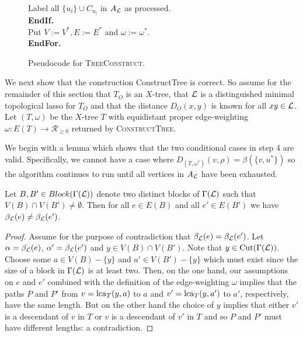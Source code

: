 \begin{figure}
{\begin{tabbing}
 \> \> \> Label all $\{u_i\} \cup C_{u_i}$ in $A_{{\mathcal L}}$ as processed.\\

 \> \> \textbf{EndIf.}\\

 \> \> Put $V:=V^*, E:=E^*$ and $\omega:=\omega^*$.\\

 \> \textbf{EndFor.}

         \end{tabbing}}
\caption{Pseudocode for \textsc{TreeConstruct}.}
\label{algorithm:treeconstruct2}
\end{figure}

We next show that the construction ConstructTree is correct.  So assume for
the remainder of this section that $T_O$ is an $X$-tree, that ${\mathcal L}$ is a
distinguished minimal topological lasso for $T_O$ and that the distance $D_O(x,y)$
is known for all $xy \in {\mathcal L}$.  Let $(T,\omega)$ be the $X$-tree $T$ with
equidistant proper edge-weighting $\omega \colon E(T) \to
\mathcal{R}_{\geq 0}$ returned by \textsc{ConstructTree}.

We begin with a lemma which shows that the two conditional cases in step 4 are
valid.  Specifically, we cannot have a case where
$D_{(T,\omega^*)}(v,\rho) = \beta(\{v,u^*\})$ so the algorithm continues to
run until all vertices in $A_{{\mathcal L}}$ have been exhausted.

\begin{lem}
  \label{lem:nonequal-adjacent}
  Let $B,B' \in Block(\Gamma({\mathcal L}))$ denote two distinct blocks of
  $\Gamma({\mathcal L})$ such that $V(B) \cap V(B') \neq \emptyset$.  Then for all $e
  \in E(B)$ and all $e' \in E(B')$ we have $\beta_{{\mathcal L}}(e) \neq \beta_{{\mathcal L}}(e')$.
\end{lem}

\begin{proof}
  Assume for the purpose of contradiction that $\beta_{{\mathcal L}}(e) = \beta_{{\mathcal L}}(e')$.  Let
  $\alpha = \beta_{{\mathcal L}}(e)$, $\alpha' = \beta_{{\mathcal L}}(e')$ and $y \in V(B) \cap V(B')$.  Note
  that $y \in \operatorname*{Cut}(\Gamma({\mathcal L}))$.  Choose some $a \in V(B) - \{y\}$ and $a'
  \in V(B') - \{y\}$ which must exist since the size of a block in
  $\Gamma({\mathcal L})$ is at least two.  Then, on the one hand, our assumptions on
  $e$ and $e'$ combined with the definition of the edge-weighting $\omega$
  implies that the paths $P$ and $P'$ from $v = \operatorname{lca}_{T}(y,a)$ to $a$ and $v'
  = \operatorname{lca}_{T}(y,a')$ to $a'$, respectively, have the same length.  But on the
  other hand the choice of $y$ implies that either $v'$ is a descendant of $v$
  in $T$ or $v$ is a descendant of $v'$ in $T$ and so $P$ and $P'$ must have
  different lengths: a contradiction.
\end{proof}

